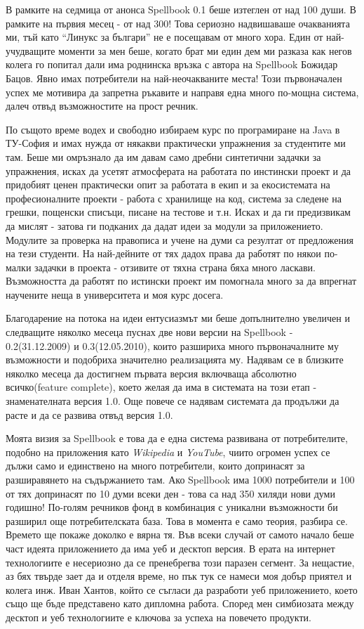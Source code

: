 В рамките на седмица от анонса Spellbook 0.1 беше изтеглен от над 100
души. В рамките на първия месец - от над 300! Това сериозно
надвишаваше очакванията ми, тъй като "`Линукс за българи"' не е
посещавам от много хора. Един от най-учудващите моменти за мен беше,
когато брат ми един дем ми разказа как негов колега го попитал дали
има роднинска връзка с автора на Spellbook Божидар Бацов. Явно имах
потребители на най-неочакваните места! Този първоначален успех ме
мотивира да запретна ръкавите и направя една много по-мощна система,
далеч отвъд възможностите на прост речник. 

По същото време водех и свободно избираем курс по програмиране на Java
в ТУ-София и имах нужда от някакви практически упражнения за
студентите ми там. Беше ми омръзнало да им давам само дребни
синтетични задачки за упражнения, исках да усетят атмосферата на
работата по инстински проект и да придобият ценен практически опит за
работата в екип и за екосистемата на професионалните проекти - работа
с хранилище на код, система за следене на грешки, пощенски списъци,
писане на тестове и т.н. Исках и да ги предизвикам да мислят - затова
ги подканих да дадат идеи за модули за приложението. Модулите за
проверка на правописа и учене на думи са резултат от предложения на
тези студенти. На най-дейните от тях дадох права да работят по някои
по-малки задачки в проекта - отзивите от тяхна страна бяха много
ласкави. Възможността да работят по истински проект им помогнала много
за да впрегнат научените неща в университета и моя курс досега.

Благодарение на потока на идеи ентусиазмът ми беше допълнително
увеличен и следващите няколко месеца пуснах две нови версии на
Spellbook - 0.2(31.12.2009) и 0.3(12.05.2010), които разшириха много
първоначалните му възможности и подобриха значително реализацията
му. Надявам се в близките няколко месеца да достигнем първата версия
включваща абсолютно всичко(feature complete), което желая да има в
системата на този етап - знаменателната версия 1.0. Още повече се
надявам системата да продължи да расте и да се развива отвъд версия 1.0.

Моята визия за Spellbook е това да е една система развивана от
потребителите, подобно на приложения като \emph{Wikipedia} и
\emph{YouTube}, чиито огромен успех се дължи само и единствено на
много потребители, които допринасят за разширавянето на съдържанието
там. Ако Spellbook има 1000 потребители и 100 от тях допринасят по 10
думи всеки ден - това са над 350 хиляди нови думи годишно! По-голям
речников фонд в комбинация с уникални възможности би разширил още
потребителската база. Това в момента е само теория, разбира
се. Времето ще покаже доколко е вярна тя. Във всеки случай от самото
начало беше част идеята приложението да има уеб и десктоп версия. В
ерата на интернет технологиите е несериозно да се пренебрегва този
паразен сегмент. За нещастие, аз бях твърде зает да и отделя време, но
пък тук се намеси моя добър приятел и колега инж. Иван Хантов, който
се съгласи да разработи уеб приложението, което също ще бъде
представено като дипломна работа. Според мен симбиозата между десктоп
и уеб технологиите е ключова за успеха на повечето продукти.

